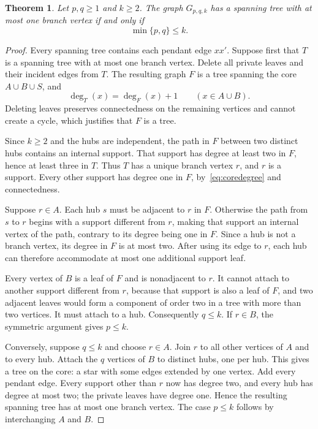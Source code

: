 \documentclass[11pt]{article}
\newtheorem{theorem}{Theorem}
\theoremstyle{remark}
\newcommand{\degg}{\operatorname{deg}}
\begin{document}
\begin{theorem}\label{thm:criterion}
Let $p,q\geq1$ and $k\geq2$. The graph $G_{p,q,k}$ has a spanning tree with at most one branch vertex if and only if
\[
 \min\{p,q\}\leq k.
\]
\end{theorem}
\begin{proof}
Every spanning tree contains each pendant edge $xx'$. Suppose first that $T$ is a spanning tree with at most one branch vertex. Delete all private leaves and their incident edges from $T$. The resulting graph $F$ is a tree spanning the core $A\cup B\cup S$, and
\begin{equation}\label{eq:coredegree}
 \degg_T(x)=\degg_F(x)+1\qquad(x\in A\cup B).
\end{equation}
Deleting leaves preserves connectedness on the remaining vertices and cannot create a cycle, which justifies that $F$ is a tree.

Since $k\geq2$ and the hubs are independent, the path in $F$ between two distinct hubs contains an internal support. That support has degree at least two in $F$, hence at least three in $T$. Thus $T$ has a unique branch vertex $r$, and $r$ is a support. Every other support has degree one in $F$, by~\eqref{eq:coredegree} and connectedness.

Suppose $r\in A$. Each hub $s$ must be adjacent to $r$ in $F$. Otherwise the path from $s$ to $r$ begins with a support different from $r$, making that support an internal vertex of the path, contrary to its degree being one in $F$. Since a hub is not a branch vertex, its degree in $F$ is at most two. After using its edge to $r$, each hub can therefore accommodate at most one additional support leaf.

Every vertex of $B$ is a leaf of $F$ and is nonadjacent to $r$. It cannot attach to another support different from $r$, because that support is also a leaf of $F$, and two adjacent leaves would form a component of order two in a tree with more than two vertices. It must attach to a hub. Consequently $q\leq k$. If $r\in B$, the symmetric argument gives $p\leq k$.

Conversely, suppose $q\leq k$ and choose $r\in A$. Join $r$ to all other vertices of $A$ and to every hub. Attach the $q$ vertices of $B$ to distinct hubs, one per hub. This gives a tree on the core: a star with some edges extended by one vertex. Add every pendant edge. Every support other than $r$ now has degree two, and every hub has degree at most two; the private leaves have degree one. Hence the resulting spanning tree has at most one branch vertex. The case $p\leq k$ follows by interchanging $A$ and $B$.
\end{proof}
\end{document}
